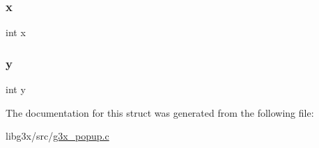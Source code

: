 \subsubsection{\texorpdfstring{x}{x}}
{\footnotesize\ttfamily int x}

\mbox{\label{struct_g3_xpopup_a0a2f84ed7838f07779ae24c5a9086d33}} 
\subsubsection{\texorpdfstring{y}{y}}
{\footnotesize\ttfamily int y}



The documentation for this struct was generated from the following file\+:\begin{DoxyCompactItemize}
\item 
libg3x/src/\hyperlink{g3x__popup_8c}{g3x\+\_\+popup.\+c}\end{DoxyCompactItemize}
